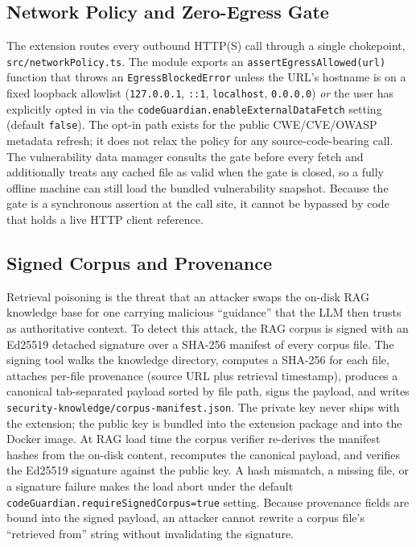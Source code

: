\subsection{Network Policy and Zero-Egress Gate}
\label{sec:impl-network-policy}

The extension routes every outbound HTTP(S) call through a single chokepoint, \texttt{src/networkPolicy.ts}. The module exports an \texttt{assertEgressAllowed(url)} function that throws an \texttt{EgressBlockedError} unless the URL's hostname is on a fixed loopback allowlist (\texttt{127.0.0.1}, \texttt{::1}, \texttt{localhost}, \texttt{0.0.0.0}) \emph{or} the user has explicitly opted in via the \texttt{codeGuardian.enableExternalDataFetch} setting (default \texttt{false}). The opt-in path exists for the public CWE/CVE/OWASP metadata refresh; it does not relax the policy for any source-code-bearing call. The vulnerability data manager consults the gate before every fetch and additionally treats any cached file as valid when the gate is closed, so a fully offline machine can still load the bundled vulnerability snapshot. Because the gate is a synchronous assertion at the call site, it cannot be bypassed by code that holds a live HTTP client reference.

\subsection{Signed Corpus and Provenance}
\label{sec:impl-corpus-signing}

Retrieval poisoning is the threat that an attacker swaps the on-disk RAG knowledge base for one carrying malicious ``guidance'' that the LLM then trusts as authoritative context. To detect this attack, the RAG corpus is signed with an Ed25519 detached signature over a SHA-256 manifest of every corpus file. The signing tool walks the knowledge directory, computes a SHA-256 for each file, attaches per-file provenance (source URL plus retrieval timestamp), produces a canonical tab-separated payload sorted by file path, signs the payload, and writes \texttt{security-knowledge/corpus-manifest.json}. The private key never ships with the extension; the public key is bundled into the extension package and into the Docker image. At RAG load time the corpus verifier re-derives the manifest hashes from the on-disk content, recomputes the canonical payload, and verifies the Ed25519 signature against the public key. A hash mismatch, a missing file, or a signature failure makes the load abort under the default \texttt{codeGuardian.requireSignedCorpus=true} setting. Because provenance fields are bound into the signed payload, an attacker cannot rewrite a corpus file's ``retrieved from'' string without invalidating the signature.

